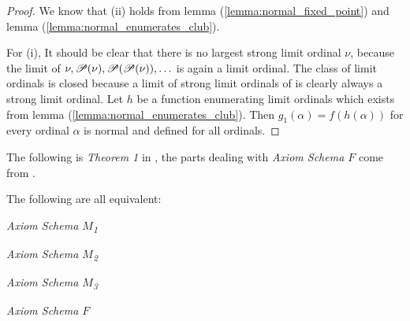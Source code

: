 \begin{proof}
We know that (ii) holds from lemma (\ref{lemma:normal_fixed_point}) and lemma (\ref{lemma:normal_enumerates_club}).

For (i), It should be clear that there is no largest strong limit ordinal $\nu$, because the limit of $\nu, \mathscr{P} (\nu), \mathscr{P} (\mathscr{P} (\nu)), \ldots$ is again a limit ordinal. %
The class of limit ordinals is closed because a limit of strong limit ordinals of is clearly always a strong limit ordinal.
Let $h$ be a function enumerating limit ordinals which exists from lemma (\ref{lemma:normal_enumerates_club}). 
Then $g_1(\alpha) = f(h(\alpha))$ for every ordinal $\alpha$ is normal and defined for all ordinals.
\end{proof}

The following is \emph{Theorem 1} in \cite{Levy60a}, the parts dealing with \emph{Axiom Schema $F$} come from \cite{DrakeBook}.

\begin{theorem}
The following are all equivalent:
\bce[(i)]
\item \emph{Axiom Schema $M$\textsubscript{1}}
\item \emph{Axiom Schema $M$\textsubscript{2}} 
\item \emph{Axiom Schema $M$\textsubscript{3}} 
\item \emph{Axiom Schema $F$}
\ece
\end{theorem}

